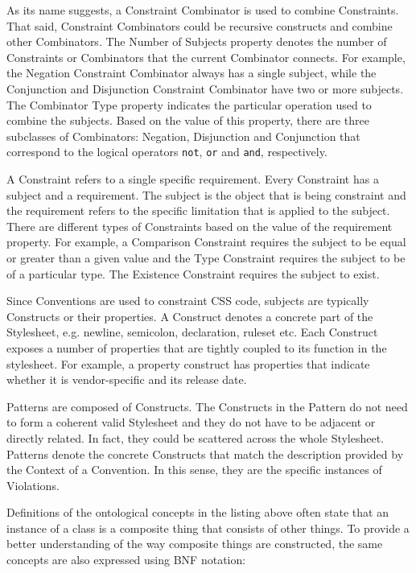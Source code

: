 As its name suggests, a Constraint Combinator is used to combine Constraints. That said, Constraint
Combinators could be recursive constructs and combine other Combinators. The Number of Subjects
property denotes the number of Constraints or Combinators that the current Combinator connects. For
example, the Negation Constraint Combinator always has a single subject, while the Conjunction and
Disjunction Constraint Combinator have two or more subjects. The Combinator Type property indicates
the particular operation used to combine the subjects. Based on the value of this property, there
are three subclasses of Combinators: Negation, Disjunction and Conjunction that correspond to the
logical operators \texttt{not}, \texttt{or} and \texttt{and}, respectively.

A Constraint refers to a single specific requirement. Every Constraint has a subject and a
requirement. The subject is the object that is being constraint and the requirement refers to the
specific limitation that is applied to the subject. There are different types of Constraints based
on the value of the requirement property. For example, a Comparison Constraint requires the subject
to be equal or greater than a given value and the Type Constraint requires the subject to be of a
particular type. The Existence Constraint requires the subject to exist.

Since Conventions are used to constraint CSS code, subjects are typically Constructs or their
properties. A Construct denotes a concrete part of the Stylesheet, e.g. newline, semicolon,
declaration, ruleset etc. Each Construct exposes a number of properties that are tightly coupled to
its function in the stylesheet. For example, a property construct has properties
that indicate whether it is vendor-specific and its release date.

Patterns are composed of Constructs. The Constructs in the Pattern do not need to form a coherent
valid Stylesheet and they do not have to be adjacent or directly related. In fact, they could be
scattered across the whole Stylesheet. Patterns denote the concrete Constructs that match the
description provided by the Context of a Convention. In this sense, they are the specific instances
of Violations.

Definitions of the ontological concepts in the listing above often state that an instance of a
class is a composite thing that consists of other things. To provide a better understanding of the
way composite things are constructed, the same concepts are also expressed using BNF notation:

